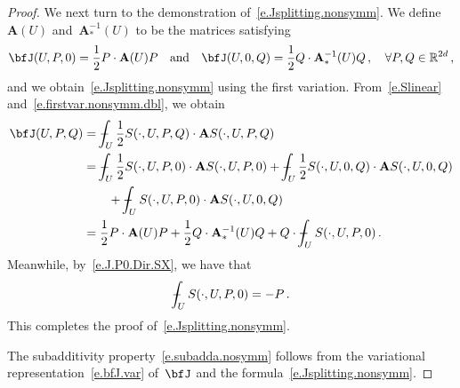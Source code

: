 \documentclass[11pt,twoside]{article} %
\numberwithin{equation}{section}
\theoremstyle{definition}
\newcommand*{\R}{\ensuremath{\mathbb{R}}}
\def\Xint#1{\mathchoice
{\XXint\displaystyle\textstyle{#1}}%
{\XXint\textstyle\scriptstyle{#1}}%
{\XXint\scriptstyle\scriptscriptstyle{#1}}%
{\XXint\scriptscriptstyle\scriptscriptstyle{#1}}%
\!\int}
\def\XXint#1#2#3{{\setbox0=\hbox{$#1{#2#3}{\int}$}
\vcenter{\hbox{$#2#3$}}\kern-.5\wd0}}
\def\fint{\Xint-}
\newcommand{\bfA}{\mathbf{A}}
\begin{document}
\begin{proof}
\smallskip

We next turn to the demonstration of~\eqref{e.Jsplitting.nonsymm}. We define~$\bfA(U)$ and~$\bfA_*^{-1}(U)$ to be the matrices satisfying
\begin{equation*}
\bfJ(U,P,0)
=
\frac12 P \cdot \bfA(U) P 
\quad \mbox{and} \quad 
\bfJ(U,0,Q)
=
\frac12 Q \cdot \bfA_*^{-1}(U) Q
\,,\quad \forall P,Q  \in \R^{2d}\,,
\end{equation*}
and we obtain~\eqref{e.Jsplitting.nonsymm} using the first variation. 
From~\eqref{e.Slinear} and~\eqref{e.firstvar.nonsymm.dbl}, we obtain
\begin{align}
\label{e.bfJ.formula.via.bfA}
\bfJ(U,P,Q) &
= \fint_U 
\frac12 S(\cdot,U,P,Q) \cdot \bfA S(\cdot,U,P,Q) 
\notag \\ & 
=
\fint_U 
\frac12 S(\cdot,U,P,0) \cdot \bfA S(\cdot,U,P,0) 
+
\fint_U 
\frac12 S(\cdot,U,0,Q) \cdot \bfA S(\cdot,U,0,Q) 
\notag \\ & \qquad 
+
\fint_U 
S(\cdot,U,P,0) \cdot \bfA S(\cdot,U,0,Q) 
\notag \\ & 
= 
\frac12 P \cdot \bfA(U) P
+
\frac12 Q \cdot \bfA_*^{-1}(U) Q
+
Q\cdot \fint_U 
S(\cdot,U,P,0) 
\,.
\end{align}
Meanwhile, by~\eqref{e.J.P0.Dir.SX}, we have that 
\begin{equation*}
\fint_U 
S(\cdot,U,P,0) 
=
-P\,.
\end{equation*}
This completes the proof of~\eqref{e.Jsplitting.nonsymm}. 

\smallskip 

The subadditivity property~\eqref{e.subadda.nosymm} follows from the variational representation~\eqref{e.bfJ.var} of~$\bfJ$ and the formula~\eqref{e.Jsplitting.nonsymm}.

\smallskip


\end{proof}
\end{document}
